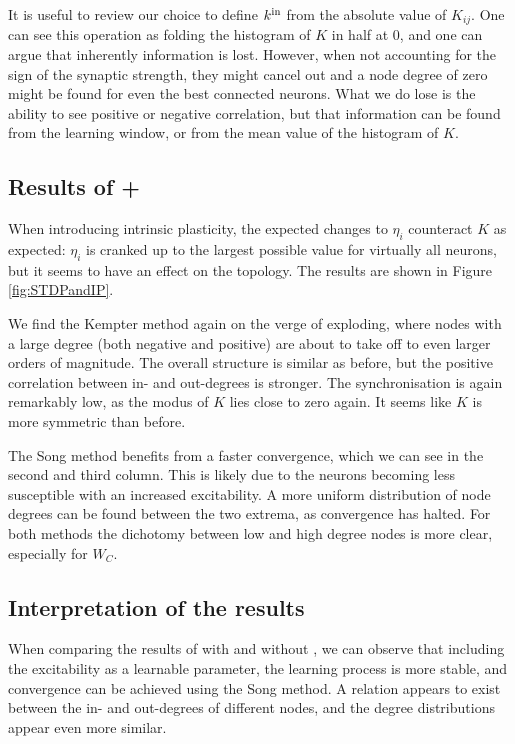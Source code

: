 It is useful to review our choice to define ${k^{\rm in}}$ from the absolute value of $K_{ij}$. One can see this operation as folding the histogram of $K$ in half at 0, and one can argue that inherently information is lost. However, when not accounting for the sign of the synaptic strength, they might cancel out and a node degree of zero might be found for even the best connected neurons. What we do lose is the ability to see positive or negative correlation, but that information can be found from the learning window, or from the mean value of the histogram of $K$.


\subsection{Results of \STDP + \IP} \label{sec:STDPandIPlearning}
When introducing intrinsic plasticity, the expected changes to $\eta_i$ counteract $K$ as expected: $\eta_i$ is cranked up to the largest possible value for virtually all neurons, but it seems to have an effect on the topology. The results are shown in Figure \ref{fig:STDPandIP}. 

We find the Kempter method again on the verge of exploding, where nodes with a large degree (both negative and positive) are about to take off to even larger orders of magnitude. The overall structure is similar as before, but the positive correlation between in- and out-degrees is stronger. The synchronisation is again remarkably low, as the modus of $K$ lies close to zero again. It seems like $K$ is more symmetric than before.

The Song method benefits from a faster convergence, which we can see in the second and third column. This is likely due to the neurons becoming less susceptible with an increased excitability. A more uniform distribution of node degrees can be found between the two extrema, as convergence has halted. For both methods the dichotomy between low and high degree nodes is more clear, especially for $W_C$.

\subsection{Interpretation of the results}
When comparing the results of \STDP with and without \IP, we can observe that including the excitability as a learnable parameter, the learning process is more stable, and convergence can be achieved using the Song method. A relation appears to exist between the in- and out-degrees of different nodes, and the degree distributions appear even more similar.


